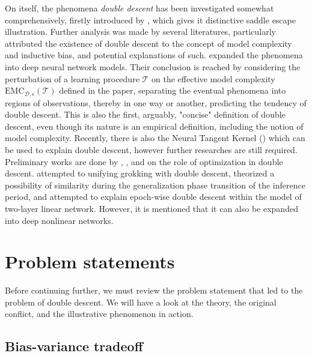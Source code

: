 \documentclass[10pt]{article} %
\begin{document}
On itself, the phenomena \textit{double descent} has been investigated somewhat comprehensively, firstly introduced by \cite{belkin_reconciling_2019}, which gives it distinctive saddle escape illustration. Further analysis was made by several literatures, particularly attributed the existence of double descent to the concept of model complexity and inductive bias, and potential explanations of such. \cite{nakkiran_deep_2019} expanded the phenomena into deep neural network models. Their conclusion is reached by considering the perturbation of a learning procedure $\mathcal{T}$ on the effective model complexity $\mathrm{EMC}_{\mathcal{D},\epsilon}(\mathcal{T})$ defined in the paper, separating the eventual phenomena into regions of observations, thereby in one way or another, predicting the tendency of double descent. This is also the first, arguably, "concise" definition of double descent, even though its nature is an empirical definition, including the notion of model complexity. Recently, there is also the Neural Tangent Kernel (\cite{Jacot:2018:NTK}) which can be used to explain double descent, however further researches are still required. Preliminary works are done by \cite{lafon_understanding_2024}, \cite{schaeffer_double_2023}, and \cite{liu2023understandingroleoptimizationdouble} on the role of optimization in double descent. \cite{davies_unifying_2023} attempted to unifying grokking with double descent, theorized a possibility of similarity during the generalization phase transition of the inference period, and \cite{olmin2024understandingepochwisedoubledescent} attempted to explain epoch-wise double descent within the model of two-layer linear network. However, it is mentioned that it can also be expanded into deep nonlinear networks. 

\section{Problem statements}

Before continuing further, we must review the problem statement that led to the problem of double descent. We will have a look at the theory, the original conflict, and the illustrative phenomenon in action. 

\subsection{Bias-variance tradeoff}
\end{document}
